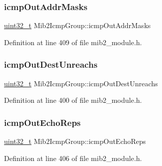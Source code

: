 \mbox{\label{structMib2IcmpGroup_aac48c7dce1e34414f07a20c776a52288}} 
\subsubsection{\texorpdfstring{icmp\+Out\+Addr\+Masks}{icmpOutAddrMasks}}
{\footnotesize\ttfamily \hyperlink{stdint_8h_a435d1572bf3f880d55459d9805097f62}{uint32\+\_\+t} Mib2\+Icmp\+Group\+::icmp\+Out\+Addr\+Masks}



Definition at line 409 of file mib2\+\_\+module.\+h.

\mbox{\label{structMib2IcmpGroup_a4bc8508ea6c693762a0d3e3c610e69b5}} 
\subsubsection{\texorpdfstring{icmp\+Out\+Dest\+Unreachs}{icmpOutDestUnreachs}}
{\footnotesize\ttfamily \hyperlink{stdint_8h_a435d1572bf3f880d55459d9805097f62}{uint32\+\_\+t} Mib2\+Icmp\+Group\+::icmp\+Out\+Dest\+Unreachs}



Definition at line 400 of file mib2\+\_\+module.\+h.

\mbox{\label{structMib2IcmpGroup_a8fce613d3cbe66f99007fd133eb2783a}} 
\subsubsection{\texorpdfstring{icmp\+Out\+Echo\+Reps}{icmpOutEchoReps}}
{\footnotesize\ttfamily \hyperlink{stdint_8h_a435d1572bf3f880d55459d9805097f62}{uint32\+\_\+t} Mib2\+Icmp\+Group\+::icmp\+Out\+Echo\+Reps}



Definition at line 406 of file mib2\+\_\+module.\+h.

